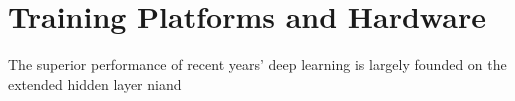 \section{Training Platforms and Hardware}
The superior performance of recent years' deep learning is largely founded on the extended hidden layer niand 
